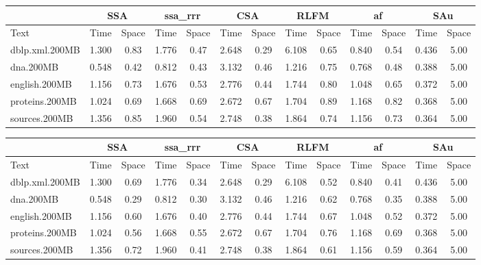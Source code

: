 \documentclass{article}
\begin{document}
\begin{tabular}{|l|c|c|c|c|c|c|c|c|c|c|c|c|}
\hline &\multicolumn{2}{c|}{ SSA } &\multicolumn{2}{c|}{ ssa\_rrr } &\multicolumn{2}{c|}{ CSA } &\multicolumn{2}{c|}{ RLFM } &\multicolumn{2}{c|}{ af } &\multicolumn{2}{c|}{ SAu } \\\hline
Text & Time & Space & Time & Space & Time & Space & Time & Space & Time & Space & Time & Space \\ 
\hline
\hline
dblp.xml.200MB & 1.300 & 0.83 & 1.776 & 0.47 & 2.648 & 0.29 & 6.108 & 0.65 & 0.840 & 0.54 & 0.436 & 5.00 \\ 
\hline
dna.200MB & 0.548 & 0.42 & 0.812 & 0.43 & 3.132 & 0.46 & 1.216 & 0.75 & 0.768 & 0.48 & 0.388 & 5.00 \\ 
\hline
english.200MB & 1.156 & 0.73 & 1.676 & 0.53 & 2.776 & 0.44 & 1.744 & 0.80 & 1.048 & 0.65 & 0.372 & 5.00 \\ 
\hline
proteins.200MB & 1.024 & 0.69 & 1.668 & 0.69 & 2.672 & 0.67 & 1.704 & 0.89 & 1.168 & 0.82 & 0.368 & 5.00 \\ 
\hline
sources.200MB & 1.356 & 0.85 & 1.960 & 0.54 & 2.748 & 0.38 & 1.864 & 0.74 & 1.156 & 0.73 & 0.364 & 5.00 \\ 
\hline
\end{tabular}

\begin{tabular}{|l|c|c|c|c|c|c|c|c|c|c|c|c|}
\hline &\multicolumn{2}{c|}{ SSA } &\multicolumn{2}{c|}{ ssa\_rrr } &\multicolumn{2}{c|}{ CSA } &\multicolumn{2}{c|}{ RLFM } &\multicolumn{2}{c|}{ af } &\multicolumn{2}{c|}{ SAu } \\\hline
Text & Time & Space & Time & Space & Time & Space & Time & Space & Time & Space & Time & Space \\ 
\hline
\hline
dblp.xml.200MB & 1.300 & 0.69 & 1.776 & 0.34 & 2.648 & 0.29 & 6.108 & 0.52 & 0.840 & 0.41 & 0.436 & 5.00 \\ 
\hline
dna.200MB & 0.548 & 0.29 & 0.812 & 0.30 & 3.132 & 0.46 & 1.216 & 0.62 & 0.768 & 0.35 & 0.388 & 5.00 \\ 
\hline
english.200MB & 1.156 & 0.60 & 1.676 & 0.40 & 2.776 & 0.44 & 1.744 & 0.67 & 1.048 & 0.52 & 0.372 & 5.00 \\ 
\hline
proteins.200MB & 1.024 & 0.56 & 1.668 & 0.55 & 2.672 & 0.67 & 1.704 & 0.76 & 1.168 & 0.69 & 0.368 & 5.00 \\ 
\hline
sources.200MB & 1.356 & 0.72 & 1.960 & 0.41 & 2.748 & 0.38 & 1.864 & 0.61 & 1.156 & 0.59 & 0.364 & 5.00 \\ 
\hline
\end{tabular}
\end{document}
